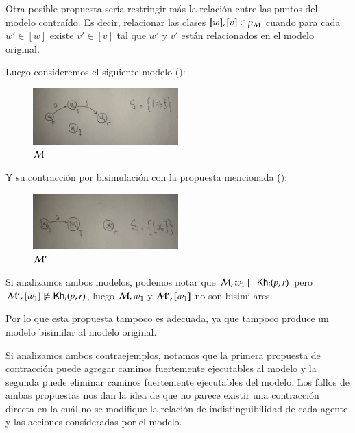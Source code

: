 Otra posible propuesta sería restringir más la relación entre las puntos del modelo contraído. Es decir, relacionar las clases 
$[w], [v] \in \rho_{\mathcal{M}}$ cuando para cada $w' \in [w]$ existe $v' \in [v]$ tal que $w'$ y $v'$ están relacionados en el modelo original.

Luego consideremos el siguiente modelo ():

\begin{figure}[h]
    \centering
    \includegraphics[width=0.5\textwidth]{imagenes/2da_propuesta_original.jpeg}
    \caption{$\mathcal{M}$}
    \label{fig:2ndproposaloriginal}
\end{figure}

Y su contracción por bisimulación con la propuesta mencionada ():

\begin{figure}[h]
    \centering
    \includegraphics[width=0.5\textwidth]{imagenes/2da_propuesta_contraido.jpeg}
    \caption{$\mathcal{M}'$}
    \label{fig:2ndproposalcontraction}
\end{figure}

Si analizamos ambos modelos, podemos notar que $\mathcal{M},w_1 \models \mathsf{Kh}_i(p,r)$ pero $\mathcal{M}',[w_1] \not\models \mathsf{Kh}_i(p,r)$, luego 
$\mathcal{M},w_1$ y $\mathcal{M}',[w_1]$ no son bisimilares.

Por lo que esta propuesta tampoco es adecuada, ya que tampoco produce un modelo bisimilar al modelo original.

Si analizamos ambos contraejemplos, notamos que la primera propuesta de contracción puede agregar caminos fuertemente ejecutables al modelo y la segunda puede eliminar 
caminos fuertemente ejecutables del modelo. Los fallos de ambas propuestas nos dan la idea de que no parece existir una contracción directa en la cuál 
no se modifique la relación de indistinguibilidad de cada agente y las acciones consideradas por el modelo. 

